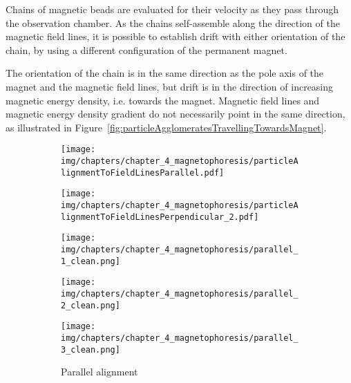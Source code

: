 Chains of magnetic beads are evaluated for their velocity as they pass through the observation chamber. As the chains self-assemble along the direction of the magnetic field lines, it is possible to establish drift with either orientation of the chain, by using a different configuration of the permanent magnet. 

The orientation of the chain is in the same direction as the pole axis of the magnet and the magnetic field lines, but drift is in the direction of increasing magnetic energy density, i.e. towards the magnet. Magnetic field lines and magnetic energy density gradient do not necessarily point in the same direction, as illustrated in Figure~\ref{fig:particleAgglomeratesTravellingTowardsMagnet}.

\begin{figure}[htb]
        \centering
        \begin{subfigure}[b]{0.48\textwidth}
        \centering
		\texttt{[image: img/chapters/chapter\_4\_magnetophoresis/particleAlignmentToFieldLinesParallel.pdf]}
        \end{subfigure}
        \hfill
        \begin{subfigure}[b]{0.48\textwidth}
        \centering
        \texttt{[image: img/chapters/chapter\_4\_magnetophoresis/particleAlignmentToFieldLinesPerpendicular\_2.pdf]}
 		\end{subfigure}
        \begin{subfigure}[b]{0.48\textwidth}
		\centering
			\begin{minipage}[t]{0.32\textwidth}
			\texttt{[image: img/chapters/chapter\_4\_magnetophoresis/parallel\_1\_clean.png]}
			\end{minipage}
			\begin{minipage}[t]{0.32\textwidth}
			\texttt{[image: img/chapters/chapter\_4\_magnetophoresis/parallel\_2\_clean.png]}
			\end{minipage}
			\begin{minipage}[t]{0.32\textwidth}
			\texttt{[image: img/chapters/chapter\_4\_magnetophoresis/parallel\_3\_clean.png]}
			\end{minipage}			
			\caption{Parallel alignment}
			\label{fig:parallelAlignment_photos}	
		\end{subfigure}   
		\hfill
		\begin{subfigure}[b]{0.48\textwidth}
		\centering
			\begin{minipage}[t]{0.32\textwidth}

\end{minipage}
\end{subfigure}
\end{figure}
